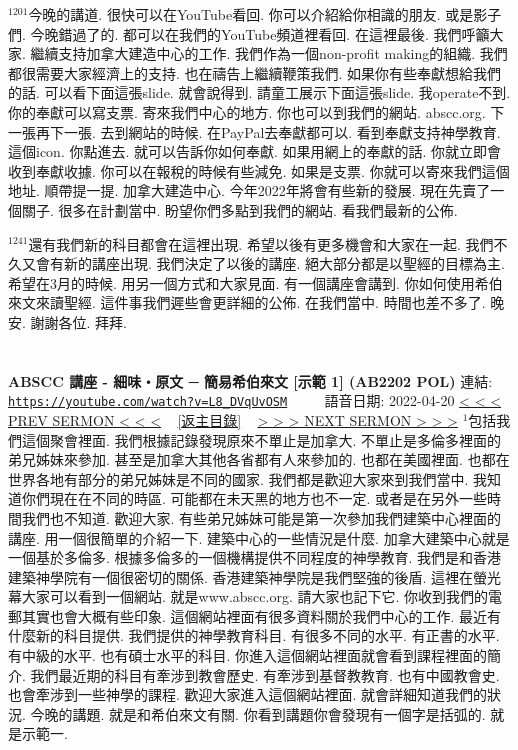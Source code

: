\documentclass{book}
\begin{document}
$^{1201}$今晚的講道.
很快可以在YouTube看回.
你可以介紹給你相識的朋友.
或是影子們.
今晚錯過了的.
都可以在我們的YouTube頻道裡看回.
在這裡最後.
我們呼籲大家.
繼續支持加拿大建造中心的工作.
我們作為一個non-profit making的組織.
我們都很需要大家經濟上的支持.
也在禱告上繼續鞭策我們.
如果你有些奉獻想給我們的話.
可以看下面這張slide.
就會說得到.
請童工展示下面這張slide.
我operate不到.
你的奉獻可以寫支票.
寄來我們中心的地方.
你也可以到我們的網站.
abscc.org.
下一張再下一張.
去到網站的時候.
在PayPal去奉獻都可以.
看到奉獻支持神學教育.
這個icon.
你點進去.
就可以告訴你如何奉獻.
如果用網上的奉獻的話.
你就立即會收到奉獻收據.
你可以在報稅的時候有些減免.
如果是支票.
你就可以寄來我們這個地址.
順帶提一提.
加拿大建造中心.
今年2022年將會有些新的發展.
現在先賣了一個關子.
很多在計劃當中.
盼望你們多點到我們的網站.
看我們最新的公佈.

$^{1241}$還有我們新的科目都會在這裡出現.
希望以後有更多機會和大家在一起.
我們不久又會有新的講座出現.
我們決定了以後的講座.
絕大部分都是以聖經的目標為主.
希望在3月的時候.
用另一個方式和大家見面.
有一個講座會講到.
你如何使用希伯來文來讀聖經.
這件事我們遲些會更詳細的公佈.
在我們當中.
時間也差不多了.
晚安.
謝謝各位.
拜拜.
\newpage



\section{}
\label{sec:L8_DVqUvOSM}
\textbf{ABSCC 講座 - 細味‧原文 ─ 簡易希伯來文 [示範 1] (AB2202 POL)}
\newline
\newline
連結: \href{https://youtube.com/watch?v=L8_DVqUvOSM}{\texttt{https://youtube.com/watch?v=L8\_DVqUvOSM}} ~~~~ 語音日期: 2022-04-20
\newline
\newline
\hyperref[sec:GA78znQ7bg4]{\small{< < < PREV SERMON < < <}}
~
\hyperref[sec:index]{\small{[返主目錄]}}
~
\hyperref[sec:efm9yyrZOo0]{\small{> > > NEXT SERMON > > >}}
\newline
\newline
$^{1}$包括我們這個聚會裡面.
我們根據記錄發現原來不單止是加拿大.
不單止是多倫多裡面的弟兄姊妹來參加.
甚至是加拿大其他各省都有人來參加的.
也都在美國裡面.
也都在世界各地有部分的弟兄姊妹是不同的國家.
我們都是歡迎大家來到我們當中.
我知道你們現在在不同的時區.
可能都在未天黑的地方也不一定.
或者是在另外一些時間我們也不知道.
歡迎大家.
有些弟兄姊妹可能是第一次參加我們建築中心裡面的講座.
用一個很簡單的介紹一下.
建築中心的一些情況是什麼.
加拿大建築中心就是一個基於多倫多.
根據多倫多的一個機構提供不同程度的神學教育.
我們是和香港建築神學院有一個很密切的關係.
香港建築神學院是我們堅強的後盾.
這裡在螢光幕大家可以看到一個網站.
就是www.abscc.org.
請大家也記下它.
你收到我們的電郵其實也會大概有些印象.
這個網站裡面有很多資料關於我們中心的工作.
最近有什麼新的科目提供.
我們提供的神學教育科目.
有很多不同的水平.
有正書的水平.
有中級的水平.
也有碩士水平的科目.
你進入這個網站裡面就會看到課程裡面的簡介.
我們最近期的科目有牽涉到教會歷史.
有牽涉到基督教教育.
也有中國教會史.
也會牽涉到一些神學的課程.
歡迎大家進入這個網站裡面.
就會詳細知道我們的狀況.
今晚的講題.
就是和希伯來文有關.
你看到講題你會發現有一個字是括弧的.
就是示範一.
\end{document}
